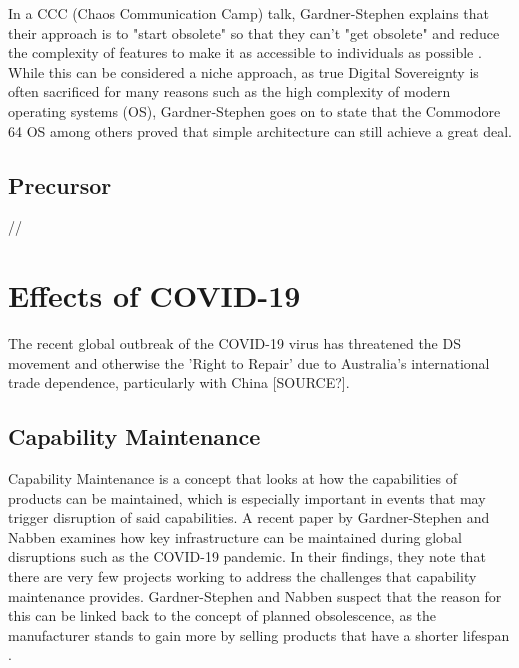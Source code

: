 In a CCC (Chaos Communication Camp) talk, Gardner-Stephen explains that their approach is to "start obsolete" so that they can't "get obsolete" and reduce the complexity of features to make it as accessible to individuals as possible \cite{mobilehistory}.
While this can be considered a niche approach, as true Digital Sovereignty is often sacrificed for many reasons such as the high complexity of modern operating systems (OS), Gardner-Stephen goes on to state that the Commodore 64 OS among others proved that simple architecture can still achieve a great deal.

\subsection{Precursor}

// 


\section{Effects of COVID-19}
The recent global outbreak of the COVID-19 virus has threatened the DS movement and otherwise the 'Right to Repair' due to Australia's international trade dependence, particularly with China [SOURCE?].

\subsection{Capability Maintenance} %

Capability Maintenance is a concept that looks at how the capabilities of products can be maintained, which is especially important in events that may trigger disruption of said capabilities.
A recent paper by Gardner-Stephen and Nabben \cite{capability} examines how key infrastructure can be maintained during global disruptions such as the COVID-19 pandemic.
In their findings, they note that there are very few projects working to address the challenges that capability maintenance provides.
Gardner-Stephen and Nabben suspect that the reason for this can be linked back to the concept of planned obsolescence, as the manufacturer stands to gain more by selling products that have a shorter lifespan \cite{obsolescence2}.

